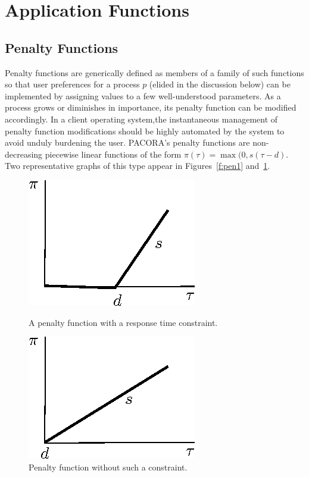 \section{Application Functions}
\subsection*{Penalty Functions}

Penalty functions  are generically defined as members of a family of such functions
so that user preferences for a process $p$ (elided in the discussion below)
can be implemented by assigning values to a few well-understood parameters.
As a process grows or diminishes in importance, its penalty function can be modified accordingly.
In a client operating system,the instantaneous management of penalty function modifications
should be highly automated by the system to avoid unduly burdening the user.
PACORA's penalty functions are non-decreasing piecewise linear functions of the form
$\pi(\tau) = \max(0, s(\tau - d)$.
Two representative graphs of this type appear in Figures~\ref{f:pen1} and~\ref{f:pen2}.

\begin{figure}[hb]
\parbox{1.6in}{
\includegraphics*{Penalty1.eps}
\caption{\label{f:pen1}A penalty function with a response time constraint.}
}
\hspace{\fill}
\parbox{1.6in}{
\includegraphics*{Penalty2.eps}
\caption{\label{f:pen2}Penalty function without such a constraint.}
}
\end{figure}

